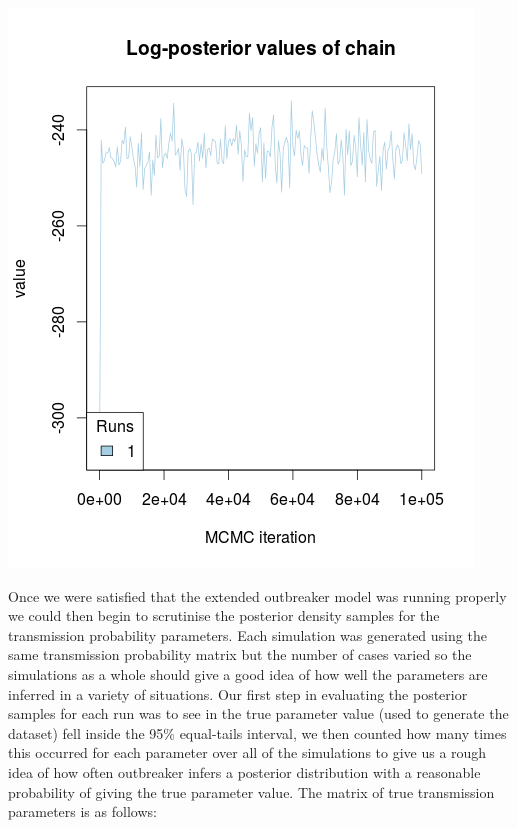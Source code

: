 \documentclass[11pt,a4paper]{report}
\begin{document}
\begin{center}
\includegraphics[scale=0.6]{trace.png}
\end{center}
Once we were satisfied that the extended outbreaker model was running properly we could then begin to scrutinise the posterior density samples for the transmission probability parameters. Each simulation was generated using the same transmission probability matrix but the number of cases varied so the simulations as a whole should give a good idea of how well the parameters are inferred in a variety of situations. Our first step in evaluating the posterior samples for each run was to see in the true parameter value (used to generate the dataset) fell inside the 95\% equal-tails interval, we then counted how many times this occurred for each parameter over all of the simulations to give us a rough idea of how often outbreaker infers a posterior distribution with a reasonable probability of giving the true parameter value. The matrix of true transmission parameters is as follows:
\end{document}

